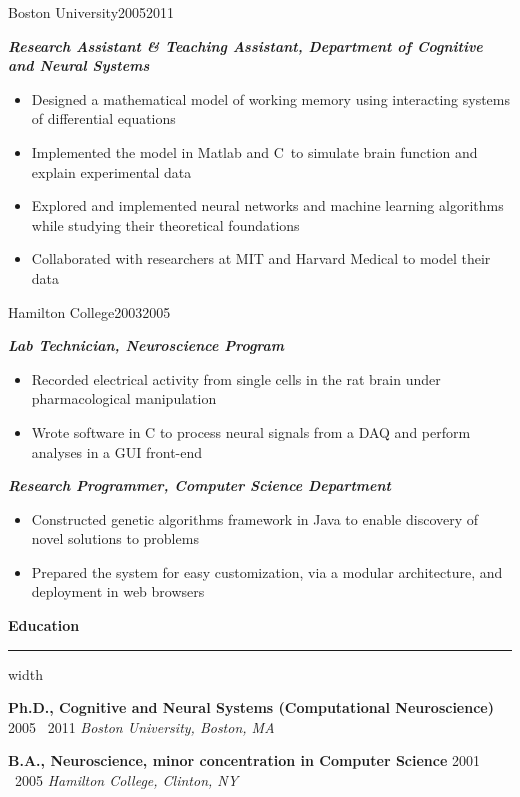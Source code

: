 \documentclass{report}
\newcommand{\CC}{C\nolinebreak\hspace{-.05em}\raisebox{.4ex}{\tiny\bf +}\nolinebreak\hspace{-.10em}\raisebox{.4ex}{\tiny\bf +}}
\newcommand{\sectionheader}[1]
{

  \vspace{.5mm}
  \noindent
  \large
  \textbf{#1}
  \vspace{.5mm}
  \color{mygray}
  \hrule width \textwidth
  \color{black}
  \vspace{3mm}

}
\newenvironment{experience_detail}[3]
{

  \noindent
  \normalsize
  \textbf{#1} \hfill \small #2 \normalsize \textendash\small~#3 \newline
  \vskip -3 mm

}
{\vspace{3mm}}
\newenvironment{position}[1]
{

  \noindent
  \textbf{\textit{#1}} \small
  \vspace{-1mm}
  \begin{itemize}[leftmargin=4mm] \setlength{\itemsep}{0cm} \setlength{\parskip}{0cm}

}
{\end{itemize}}
\newcommand{\school}[4]
{

  \noindent
  \normalsize
  \textbf{#1} \hfill \small #3 \normalsize \textendash\small~#4 \newline
  \textit{#2}

}
\begin{document}

  \begin{experience_detail}{Boston University}{2005}{2011}

    \begin{position}{Research Assistant \& Teaching Assistant, Department of Cognitive and Neural Systems}
      \item Designed a mathematical model of working memory using interacting systems of differential equations
      \item Implemented the model in Matlab and \CC~to simulate brain function and explain experimental data
      \item Explored and implemented neural networks and machine learning algorithms while studying their theoretical foundations
      \item Collaborated with researchers at MIT and Harvard Medical to model their data
    \end{position}

  \end{experience_detail}



  \begin{experience_detail}{Hamilton College}{2003}{2005}

    \begin{position}{Lab Technician, Neuroscience Program}
      \item Recorded electrical activity from single cells in the rat brain under pharmacological manipulation
      \item Wrote software in C to process neural signals from a DAQ and perform analyses in a GUI front-end
    \end{position}

    \vspace{.5mm}

    \begin{position}{Research Programmer, Computer Science Department}
      \item Constructed genetic algorithms framework in Java to enable discovery of novel solutions to problems
      \item Prepared the system for easy customization, via a modular architecture, and deployment in web browsers
    \end{position}

  \end{experience_detail}




  \sectionheader{Education}

  \school{Ph.D., Cognitive and Neural Systems (Computational Neuroscience)}{Boston University, Boston, MA}{2005}{2011}

  \vspace{2mm}

  \school{B.A., Neuroscience, minor concentration in Computer Science}{Hamilton College, Clinton, NY}{2001}{2005}
\end{document}
